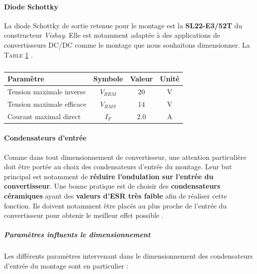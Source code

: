 				\paragraph{Diode Schottky}
					
				La diode Schottky de sortie retenue pour le montage est la 
				\textbf{SL22-E3/52T} du constructeur \textit{Vishay}. 
				Elle est notamment adaptée à des applications de convertisseurs
				DC/DC comme le montage que nous souhaitons dimensionner. 
				La \textsc{Table \ref{charact_schottky}} \cite{SL22}.
					
				\begin{table}
					\begin{center}
						\begin{tabular}{|l|c|c|c}
							\hline
							Paramètre & Symbole & Valeur & Unité \\
							\hline						
							Tension maximale inverse & $V_{RRM}$ & 20 & V \\
							\hline						
							Tension maximale efficace & $V_{RMS}$ & 14 & V \\
							\hline						
							Courant maximal direct & $I_{F}$ & 2.0 & A \\
							\hline						
						\end{tabular}					
					\end{center}
					\caption{}
					\label{charact_schottky}
				\end{table}
				
				\paragraph{Condensateurs d'entrée}
					
				Comme dans tout dimensionnement de convertisseur, une attention 
				particulière doit être portée au choix des condensateurs d'entrée
				du montage. Leur but principal est notamment de 
				\textbf{réduire l'ondulation sur l'entrée du convertisseur}. 
				Une bonne pratique est de choisir des 
				\textbf{condensateurs céramiques} ayant des 
				\textbf{valeurs d'ESR très faible} afin de réaliser cette fonction. 
				Ils doivent notamment être placés au plus proche de l'entrée du 
				convertisseur pour obtenir le meilleur effet possible \cite{A055}.
								
					\subparagraph{Paramètres influents le dimensionnement}
					Les différents paramètres intervenant dans le dimensionnement des condensateurs d'entrée du montage sont en particulier :
						
